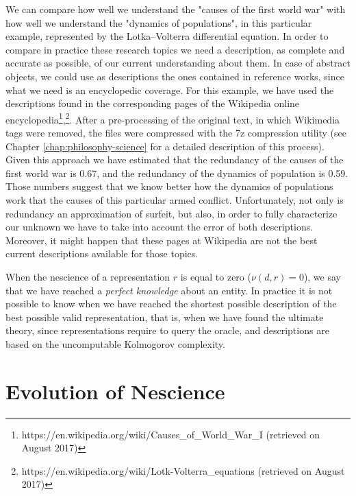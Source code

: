 \begin{example}
\label{ex:diffeq_world}
We can compare how well we understand the "causes of the first world war" with how well we understand the "dynamics of populations", in this particular example, represented by the Lotka–Volterra differential equation. In order to compare in practice these research topics we need a description, as complete and accurate as possible, of our current understanding about them. In case of abstract objects, we could use as descriptions the ones contained in reference works, since what we need is an encyclopedic coverage. For this example, we have used the descriptions found in the corresponding pages of the Wikipedia online encyclopedia\footnote{https://en.wikipedia.org/wiki/Causes\_of\_World\_War\_I (retrieved on August 2017)},\footnote{https://en.wikipedia.org/wiki/Lotk-Volterra\_equations (retrieved on August 2017)}. After a pre-processing of the original text, in which Wikimedia tags were removed, the files were compressed with the 7z compression utility (see Chapter \ref{chap:philosophy-science} for a detailed description of this process). Given this approach we have estimated that the redundancy of the causes of the first world war is 0.67, and the redundancy of the dynamics of population is 0.59. Those numbers suggest that we know better how the dynamics of populations work that the causes of this particular armed conflict. Unfortunately, not only is redundancy an approximation of surfeit, but also, in order to fully characterize our unknown we have to take into account the error of both descriptions. Moreover, it might happen that these pages at Wikipedia are not the best current descriptions available for those topics.
\end{example}

When the nescience of a representation $r$ is equal to zero ($\nu(d, r)=0$), we say that we have reached a \emph{perfect knowledge} about an entity. In practice it is not possible to know when we have reached the shortest possible description of the best possible valid representation, that is, when we have found the ultimate theory, since representations require to query the oracle, and descriptions are based on the uncomputable Kolmogorov complexity.

%
%

\section{Evolution of Nescience}

